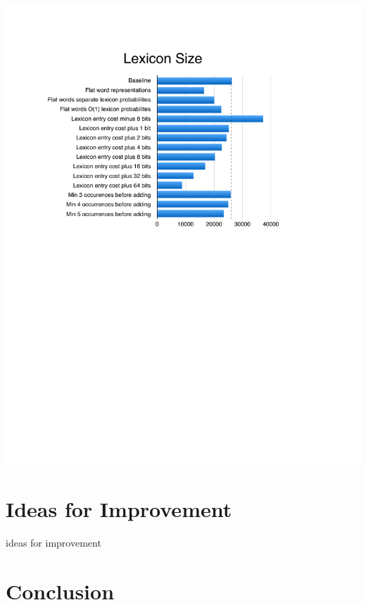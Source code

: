 \documentclass[11pt, oneside, fleqn]{article}
\begin{document}
  \includegraphics{./figure/lexicon_size.pdf}

  \section{Ideas for Improvement}

  ideas for improvement

  \section{Conclusion}
\end{document}
